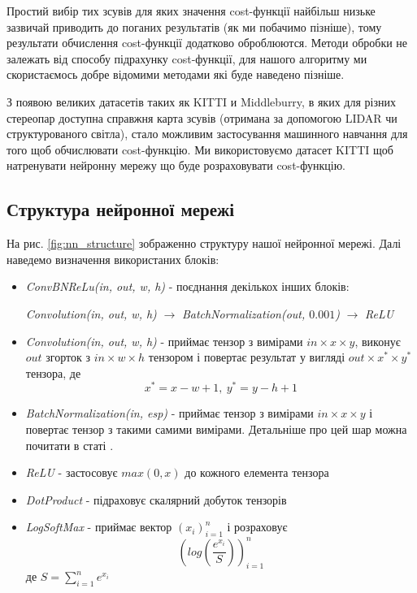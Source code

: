 \documentclass{article}
\theoremstyle{definition}
\begin{document}
Простий вибір тих зсувів для яких значення cost-функції найбільш низьке зазвичай приводить до поганих результатів (як ми побачимо пізніше), тому результати обчислення cost-функції додатково оброблюются. Методи обробки не залежать від способу підрахунку cost-функції, для нашого алгоритму ми скористаємось добре відомими методами які буде наведено пізніше.

З появою великих датасетів таких як KITTI и Middleburry, в яких для різних стереопар доступна справжня карта зсувів (отримана за допомогою LIDAR чи структурованого світла), стало можливим застосування машинного навчання для того щоб обчислювати cost-функцію. Ми використовуємо датасет KITTI щоб натренувати нейронну мережу що буде розраховувати cost-функцію.

\subsection{Структура нейронної мережі}
На рис. \ref{fig:nn_structure} зображенно структуру нашої нейронної мережі. Далі наведемо визначення використаних блоків:
\begin{itemize}
	\item \textit{ConvBNReLu(in, out, w, h)} - поєднання декількох інших блоків: 
	
	\textit{Convolution(in, out, w, h)} $\to$ \textit{BatchNormalization(out, $0.001$)} $\to$ \textit{ReLU}
	
	\item \textit{Convolution(in, out, w, h)} - приймає тензор з вимірами $in \times x \times y$, виконує $out$ згорток з $in \times w \times h$ тензором і повертає результат у вигляді $out \times x^* \times y^*$ тензора, де 
	\[ x^* = x - w + 1, \  y^* = y - h + 1 \]
	
	\item \textit{BatchNormalization(in, esp)} - приймає тензор з вимірами $in \times x \times y$ і повертає тензор з такими самими вимірами. Детальніше про цей шар можна почитати в статі \cite{ioffe2015batch}.
	
	\item \textit{ReLU} - застосовує $max(0, x)$ до кожного елемента тензора
	
	\item \textit{DotProduct} - підраховує скалярний добуток тензорів
	
	\item \textit{LogSoftMax} - приймає вектор $(x_i)_{i=1}^n$ і розраховує 
	\[ \left( log\left( \frac{e^{x_i}}{S} \right) \right)_{i=1}^n \]
	де $S = \sum_{i=1}^n e^{x_i}$
\end{itemize}
\end{document}
